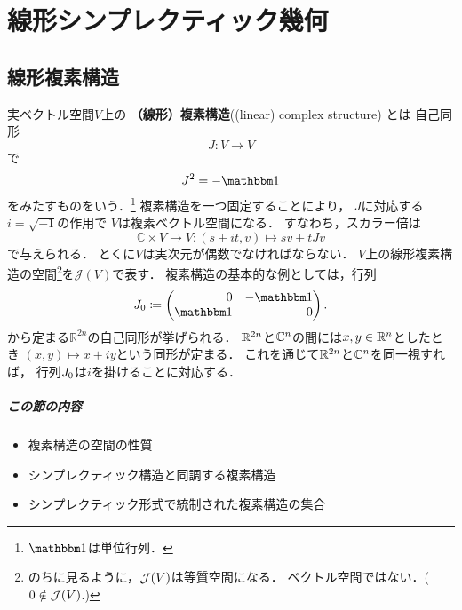 








\clearpage
\setcounter{chapter}{1}

\chapter{線形シンプレクティック幾何}
\setcounter{section}{4}
\section{線形複素構造}
実ベクトル空間\(V\)上の
\textbf{（線形）複素構造}((linear) complex structure) とは
自己同形\[
    J\colon V\to V
\]で\[
    J^2=-\um
\]をみたすものをいう．\footnote{\(\um\)は単位行列．}
複素構造を一つ固定することにより，
\(J\)に対応する\(i=\sqrt{-1}\)の作用で
\(V\)は複素ベクトル空間になる．
すなわち，スカラー倍は
\[
    \mathbb{C}\times V\to V
    \colon 
    (s+it,v)\mapsto sv+tJv
\]
で与えられる．
とくに\(V\)は実次元が偶数でなければならない．
\(V\)上の線形複素構造の空間\footnote{
    のちに見るように，\(\mathop{\mathcal{J}}(V)\)は等質空間になる．
    ベクトル空間ではない．(\(0\notin\mathop{\mathcal{J}}(V)\).)
}を\(\mathcal{J}(V)\)で表す．
複素構造の基本的な例としては，行列
\[
    \Jstd\coloneqq
    \begin{pmatrix*}[r]
        0&-\um\\
        \um&0
    \end{pmatrix*}.
\]
から定まる\(\mathbb{R}^{2n}\)の自己同形が挙げられる．
\(\mathbb{R}^{2n}\)と\(\mathbb{C}^n\)の間には\(x,y\in\mathbb{R}^n\)としたとき
\((x,y)\mapsto x+iy\)という同形が定まる．
これを通じて\(\mathbb{R}^{2n}\)と\(\mathbb{C}^n\)を同一視すれば，
行列\(\mathord{J_0}\)は\(i\)を掛けることに対応する．

\paragraph{この節の内容}
\begin{itemize}
    \item 複素構造の空間の性質
    \item シンプレクティック構造と同調する複素構造
    \item シンプレクティック形式で統制された複素構造の集合
\end{itemize}

